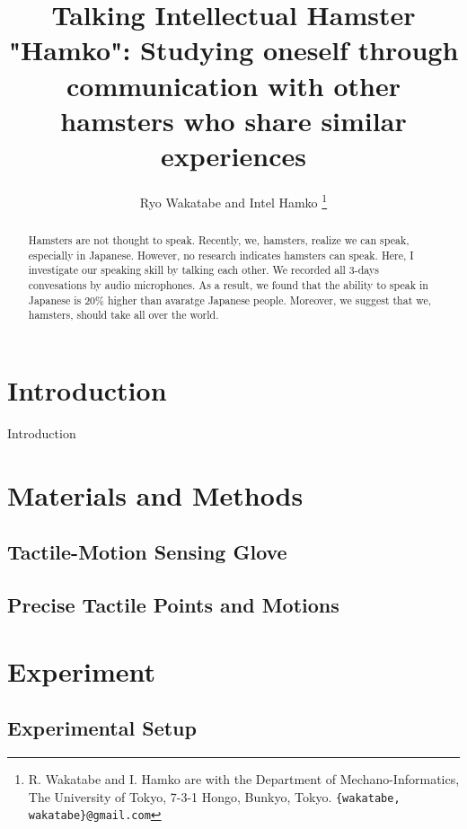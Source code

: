 \documentclass[letterpaper, 10 pt, conference]{IEEEtran}  %
\title{\LARGE \bf
Talking Intellectual Hamster "Hamko":
Studying oneself through communication with other hamsters who share similar experiences 
}
\author{Ryo Wakatabe and Intel Hamko%
    \thanks{R. Wakatabe and I. Hamko are with the Department of Mechano-Informatics, The University of Tokyo, 7-3-1 Hongo, Bunkyo, Tokyo.  {\tt\small \{wakatabe, wakatabe\}@gmail.com}}%
}
\begin{document}
\maketitle
\thispagestyle{empty}
\pagestyle{empty}

\begin{abstract}
Hamsters are not thought to speak.
Recently, we, hamsters, realize we can speak, especially in Japanese. 
However, no research indicates hamsters can speak.
Here, I investigate our speaking skill by talking each other.
We recorded all 3-days convesations by audio microphones.
As a result, we found that the ability to speak in Japanese is 20\% higher than avaratge Japanese people.
Moreover, we suggest that we, hamsters, should take all over the world.

\end{abstract}


\section{Introduction}
Introduction \cite{Cornwell1975175}

\section{Materials and Methods}

\subsection{Tactile-Motion Sensing Glove}

\subsection{Precise Tactile Points and Motions}


\section{Experiment}
\subsection{Experimental Setup}
\end{document}
